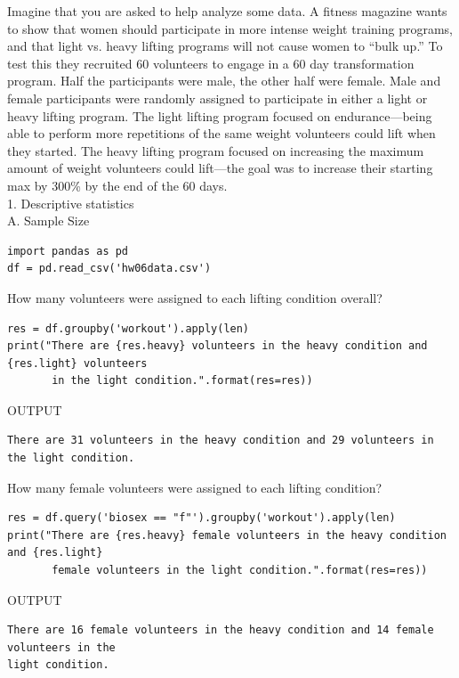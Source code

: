 \documentclass[onecolumn,10pt]{jhwhw}
\begin{document}
\problem{}
Imagine that you are asked to help analyze some data. A fitness magazine wants to show that women should participate in more intense weight training programs, and that light vs. heavy lifting programs will not cause women to ``bulk up.'' To test this they recruited 60 volunteers to engage in a 60 day transformation program. Half the participants were male, the other half were female. Male and female participants were randomly assigned to participate in either a light or heavy lifting program. The light lifting program focused on endurance---being able to perform more repetitions of the same weight volunteers could lift when they started. The heavy lifting program focused on increasing the maximum amount of weight volunteers could lift---the goal was to increase their starting max by 300\% by the end of the 60 days.
\vspace{1em}\\
1. Descriptive statistics\\
A. Sample Size
\begin{lstlisting}
import pandas as pd
df = pd.read_csv('hw06data.csv')
\end{lstlisting}

\noindent How many volunteers were assigned to each lifting condition overall?
\begin{lstlisting}
res = df.groupby('workout').apply(len)
print("There are {res.heavy} volunteers in the heavy condition and {res.light} volunteers
       in the light condition.".format(res=res))
\end{lstlisting}
\noindent OUTPUT
\begin{lstlisting}[language={}]
There are 31 volunteers in the heavy condition and 29 volunteers in the light condition.
\end{lstlisting}

\noindent How many female volunteers were assigned to each lifting condition?
\begin{lstlisting}
res = df.query('biosex == "f"').groupby('workout').apply(len)
print("There are {res.heavy} female volunteers in the heavy condition and {res.light}
       female volunteers in the light condition.".format(res=res))
\end{lstlisting}
\noindent OUTPUT
\begin{lstlisting}[language={}]
There are 16 female volunteers in the heavy condition and 14 female volunteers in the
light condition.
\end{lstlisting}
\end{document}
